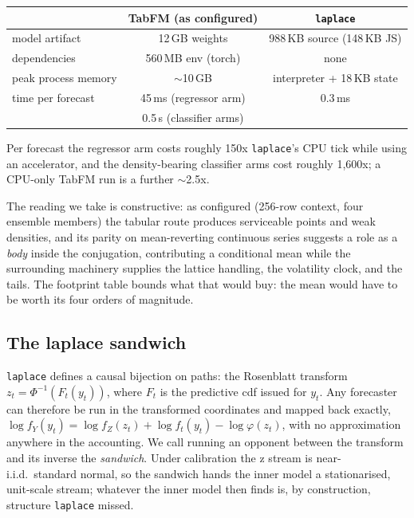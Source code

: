\documentclass[article]{jss}
\providecommand{\pkg}[1]{\textbf{#1}}
\providecommand{\code}[1]{\texttt{#1}}
\begin{document}
\begin{center}
\begin{tabular}{lcc}
\hline
 & \pkg{TabFM} (as configured) & \code{laplace} \\
\hline
model artifact      & 12\,GB weights            & 988\,KB source (148\,KB JS) \\
dependencies        & 560\,MB env (torch)       & none \\
peak process memory & ${\sim}$10\,GB            & interpreter + 18\,KB state \\
time per forecast   & 45\,ms (regressor arm)    & 0.3\,ms \\
                    & 0.5\,s (classifier arms)  & \\
\hline
\end{tabular}
\end{center}

Per forecast the regressor arm costs roughly 150x \code{laplace}'s CPU
tick while using an accelerator, and the density-bearing classifier arms
cost roughly 1,600x; a CPU-only TabFM run is a further ${\sim}$2.5x.

The reading we take is constructive: as configured (256-row context, four
ensemble members) the tabular route produces serviceable points and weak
densities, and its parity on mean-reverting continuous series suggests a
role as a \emph{body} inside the conjugation, contributing a conditional
mean while the surrounding machinery supplies the lattice handling, the
volatility clock, and the tails. The footprint table bounds what that
would buy: the mean would have to be worth its four orders of magnitude.

\subsection{The laplace sandwich} \label{sec:sandwich}

\code{laplace} defines a causal bijection on paths: the Rosenblatt
transform $z_t = \Phi^{-1}(F_t(y_t))$, where $F_t$ is the predictive cdf
issued for $y_t$. Any forecaster can therefore be run in the transformed
coordinates and mapped back exactly,
$\log f_Y(y_t) = \log f_Z(z_t) + \log f_t(y_t) - \log\varphi(z_t)$,
with no approximation anywhere in the accounting. We call running an
opponent between the transform and its inverse the \emph{sandwich}. Under
calibration the z stream is near-i.i.d.\ standard normal, so the sandwich
hands the inner model a stationarised, unit-scale stream; whatever the
inner model then finds is, by construction, structure \code{laplace}
missed.
\end{document}
